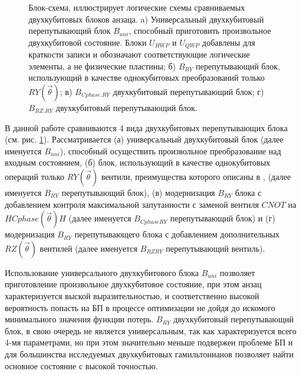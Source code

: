\documentclass[14pt]{extarticle}
\begin{document}
\begin{figure}[H]
\begin{minipage}[H]{0.62\linewidth}
\end{minipage}
\caption{Блок-схема, иллюстрирует логические схемы сравниваемых двухкубитовых блоков анзаца. a) Универсальный двухкубитовый перепутывающий блок $B_{uni}$, способный приготовить произвольное двухкубитовой состояние. Блоки $U_{HWP}$ и $U_{QWP}$ добавлены для краткости записи и обозначают соответствующие логические элементы, а не физические пластины; б) $B_{RY}$ перепутывающий блок, использующий в качестве однокубитовых преобразований только $RY(\vec \theta)$; в) $B_{Cphase.RY}$ двухкубитовый перепутывающий блок; г) $B_{RZ.RY}$ двухкубитовый перепутывающий блок.}\label{fig:block_comp}
\end{figure}

\qquad В данной работе сравниваются 4 вида двухкубитовых перепутывающих блока (см. рис. \ref{fig:block_comp}). Рассматривается (а) универсальный двухкубитовый блок (далее именуется $B_{uni}$), способный осуществить произвольное преобразование над  входным состоянием, (б) блок, использующий в качестве однокубитовых операций только $RY(\vec \theta)$ вентили, преимущества которого описаны в \cite{https://doi.org/10.48550/arxiv.1909.05074}, (далее именуется $B_{RY}$ перепутывающий блок), (в) модернизация $B_{RY}$ блока с добавлением контроля максимальной запутанности с заменой вентиля $CNOT$ на $HCphase(\vec \theta)H$ (далее именуется $B_{Cphase RY}$ перепутывающий блок) и (г) модернизация $B_{RY}$ перепутывающего блока с добавлением дополнительных $RZ(\vec \theta)$ вентилей (далее именуется $B_{RZ RY}$ перепутывающий вентиль).


\qquad Использование универсального двухкубитового блока $B_{uni}$  позволяет приготовление произвольное двухкубитовое состояние, при этом анзац характеризуется выской выразительностью, и соответственно высокой вероятность попасть на БП в процессе оптимизации не дойдя до искомого минимального значения функции потерь. $B_{RY}$ двухкубитовый перепутывающий  блок, в свою очередь не является универсальным, так как характеризуется всего 4-мя параметрами, но при этом значительно меньше подвержен проблеме БП и для большинства исследуемых двухкубитовых гамильтонианов позволяет найти основное состояние с высокой точностью.
\end{document}
